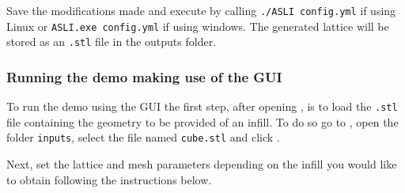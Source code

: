 Save the modifications made and execute \asli{} by calling \verb|./ASLI config.yml| if using Linux or \verb|ASLI.exe config.yml| if using windows. The generated lattice will be stored as an \texttt{.stl} file in the outputs folder.

\subsubsection{Running the demo making use of the GUI} \label{sec:demo GUI}
To run the demo using the GUI the first step, after opening \qasli{}, is to load the \texttt{.stl} file containing the geometry to be provided of an infill. To do so go to , open the folder \texttt{inputs}, select the file named \texttt{cube.stl} and click .

Next, set the lattice and mesh parameters depending on the infill you would like to obtain following the instructions below. %

